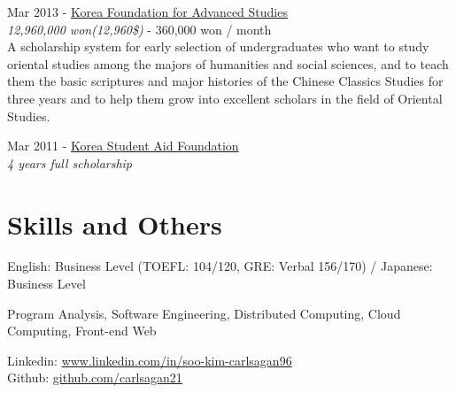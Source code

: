 \documentclass[10pt]{article} %
\begin{document}
{
Mar 2013 - \href{http://www.kfas.or.kr/?pCulture=en}{Korea Foundation for Advanced Studies}\\
\textit{12,960,000 won(12,960\$)} - 360,000 won / month\\
A scholarship system for early selection of undergraduates who want to study oriental studies among the majors of humanities and social sciences, and to teach them the basic scriptures and major histories of the Chinese Classics Studies for three years and to help them grow into excellent scholars in the field of Oriental Studies.
}

{
Mar 2011 - \href{http://eng.kosaf.go.kr/jsp/main.jsp}{Korea Student Aid Foundation}\\
\textit{4 years full scholarship}
}
\fi


\section{Skills and Others}

\if{}
{
English: Business Level (TOEFL: 104/120, GRE: Verbal 156/170) / Japanese: Business Level
}
\fi

{
Program Analysis, Software Engineering, Distributed Computing, Cloud Computing, Front-end Web
}

{
Linkedin: \href{https://www.linkedin.com/in/soo-kim-carlsagan96}{www.linkedin.com/in/soo-kim-carlsagan96}\\
Github: \href{https://github.com/carlsagan21}{github.com/carlsagan21}
}

\end{document}
